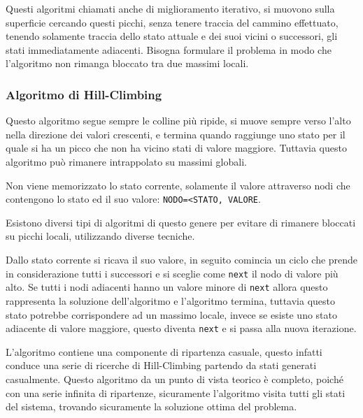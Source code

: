 \documentclass{article}
\numberwithin{equation}{subsection}
\begin{document}

Questi algoritmi chiamati anche di miglioramento iterativo, si muovono sulla superficie cercando questi picchi, senza tenere traccia del cammino effettuato, tenendo 
solamente traccia dello stato attuale e dei suoi vicini o successori, gli stati immediatamente adiacenti. 
Bisogna formulare il problema in modo che l'algoritmo non rimanga bloccato tra due massimi locali. 

\subsubsection{Algoritmo di Hill-Climbing}

Questo algoritmo segue sempre le colline più ripide, si muove sempre verso l'alto nella direzione dei valori crescenti, e termina quando raggiunge uno stato per il quale 
si ha un picco che non ha vicino stati di valore maggiore. Tuttavia questo algoritmo può rimanere intrappolato su massimi globali. 

Non viene memorizzato lo stato corrente, solamente il valore attraverso nodi che contengono lo stato ed il suo valore: \verb|NODO=<STATO, VALORE|. 

Esistono diversi tipi di algoritmi di questo genere per evitare di rimanere bloccati su picchi locali, utilizzando diverse tecniche. 


Dallo stato corrente si ricava il suo valore, in seguito comincia un ciclo che prende in considerazione tutti i successori e si sceglie come \verb|next| il nodo di 
valore più alto. Se tutti i nodi adiacenti hanno un valore minore di \verb|next| allora questo rappresenta la soluzione dell'algoritmo e l'algoritmo termina, tuttavia 
questo stato potrebbe corrispondere ad un massimo locale, invece se esiste uno stato adiacente di valore maggiore, questo diventa \verb|next| e si passa alla nuova 
iterazione. 


L'algoritmo contiene una componente di ripartenza casuale, questo infatti conduce una serie di ricerche di Hill-Climbing partendo da stati generati casualmente. Questo 
algoritmo da un punto di vista teorico è completo, poiché con una serie infinita di ripartenze, sicuramente l'algoritmo visita tutti gli stati del sistema, trovando sicuramente 
la soluzione ottima del problema. 
\end{document}
